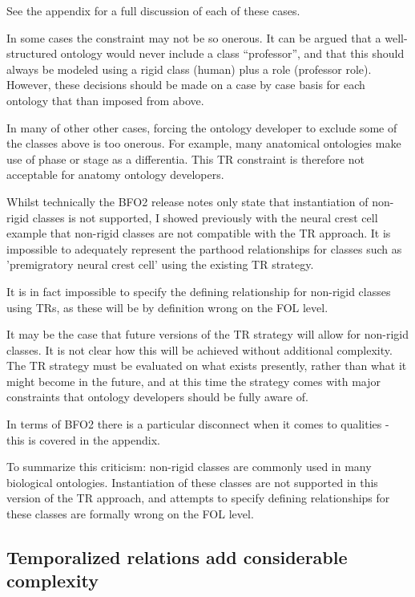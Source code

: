 \documentclass{bioinfo}
\begin{document}
See the appendix for a full discussion of each of these cases.

In some cases the constraint may not be so onerous. It can be argued
that a well-structured ontology would never include a class
``professor'', and that this should always be modeled using a rigid
class (human) plus a role (professor role). However, these decisions
should be made on a case by case basis for each ontology that than
imposed from above.

In many of other other cases, forcing the ontology developer to
exclude some of the classes above is too onerous. For example, many
anatomical ontologies make use of phase or stage as a
differentia. This TR constraint is therefore not acceptable for
anatomy ontology developers.

Whilst technically the BFO2 release notes only state that
instantiation of non-rigid classes is not supported, I showed
previously with the neural crest cell example that non-rigid classes
are not compatible with the TR approach. It is impossible to
adequately represent the parthood relationships for classes such as
'premigratory neural crest cell' using the existing TR strategy.

It is in fact impossible to specify the defining relationship for
non-rigid classes using TRs, as these will be by definition wrong on
the FOL level.

It may be the case that future versions of the TR strategy will allow
for non-rigid classes. It is not clear how this will be achieved
without additional complexity.  The TR strategy must be evaluated on
what exists presently, rather than what it might become in the future,
and at this time the strategy comes with major constraints that
ontology developers should be fully aware of.

In terms of BFO2 there is a particular disconnect when it comes to
qualities - this is covered in the appendix.

To summarize this criticism: non-rigid classes are commonly used in
many biological ontologies. Instantiation of these classes are not
supported in this version of the TR approach, and attempts to specify
defining relationships for these classes are formally wrong on the FOL
level.

\subsection{Temporalized relations add considerable complexity}
\end{document}
